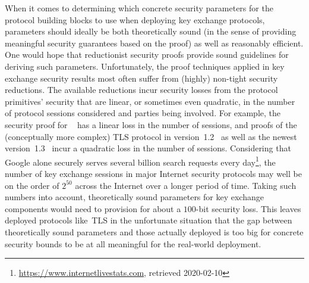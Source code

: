 When it comes to determining which concrete security parameters for the protocol building blocks to use when deploying key exchange protocols, parameters should ideally be both theoretically sound (in the sense of providing meaningful security guarantees based on the proof) as well as reasonably efficient. 
One would hope that reductionist security proofs provide sound guidelines for deriving such parameters. 
Unfortunately, the proof techniques applied in key exchange security results most often suffer from (highly) non-tight security reductions.
The available reductions incur security losses from the protocol primitives' security that are linear, or sometimes even quadratic, in the number of protocol sessions considered and parties being involved. %
For example, the security proof for \SIGMA~\cite{C:CanKra02} has a linear loss in the number of sessions, and proofs of the (conceptually more complex) TLS protocol in version~1.2~\cite{C:JKSS12,C:KraPatWee13,C:BFKPSZ14} as well as the newest version~1.3~\cite{CCS:DFGS15,EPRINT:DFGS16} incur a quadratic loss in the number of sessions. 
Considering that Google alone securely serves several billion search requests every day\footnote{\url{https://www.internetlivestats.com}, retrieved 2020-02-10},
the number of key exchange sessions in major Internet security protocols may well be on the order of $2^{50}$ across the Internet over a longer period of time. 
Taking such numbers into account, theoretically sound parameters for key exchange components would need to provision for about a $100$-bit security loss. 
This leaves deployed protocols like~TLS in the unfortunate situation that the gap between theoretically sound parameters and those actually deployed is too big for concrete security bounds to be at all meaningful for the real-world deployment.
